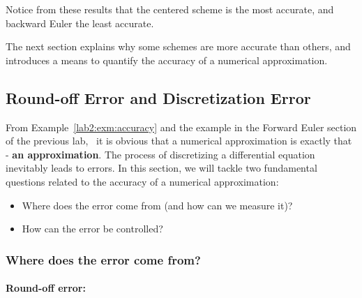 \begin{example}
  Notice from these results that the centered scheme is the most
  accurate, and backward Euler the least accurate.  
\end{example}

The next section explains why some schemes are more accurate than
others, and introduces a means to quantify the accuracy of a
numerical approximation.

\begin{latexonly}
\end{latexonly}
\subsection{Round-off Error and Discretization Error}
\label{lab2:sec:accuracy}

From Example~\ref{lab2:exm:accuracy} and the example in the Forward
Euler section of the previous lab,~
it is obvious that a numerical 
approximation is exactly that - \textbf{ an approximation}.
The process of discretizing a differential equation inevitably leads
to errors.
In this section, we will tackle two fundamental questions related to
the accuracy of a numerical approximation:
\begin{itemize}
\item Where does the error come from (and how can we measure it)?
\item How can the error be controlled?
\end{itemize}

\subsubsection{Where does the error come from?}

\paragraph{Round-off error:}

